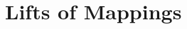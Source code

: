\documentclass[../Moduli_Spaces_of_Riemann_Surfaces.tex]{subfiles}
\begin{document}
    \section{Lifts of Mappings}
\end{document}
